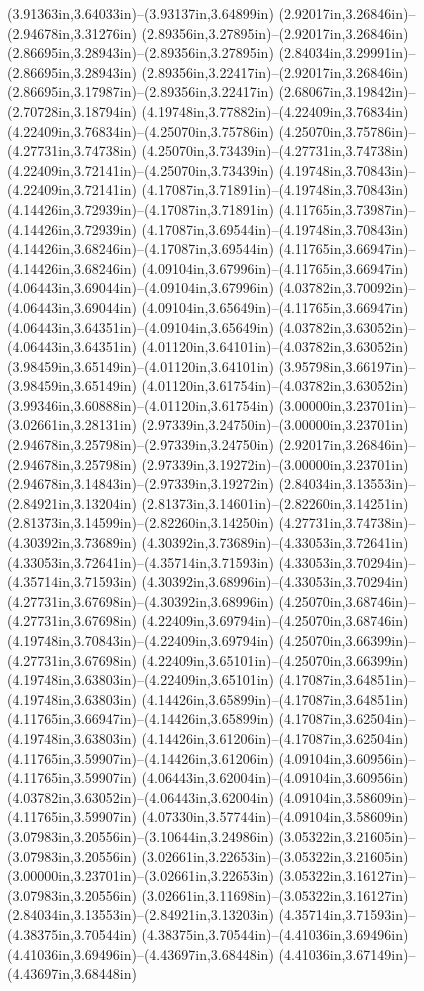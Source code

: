 (3.91363in,3.64033in)--(3.93137in,3.64899in) (2.92017in,3.26846in)--(2.94678in,3.31276in) (2.89356in,3.27895in)--(2.92017in,3.26846in) (2.86695in,3.28943in)--(2.89356in,3.27895in) (2.84034in,3.29991in)--(2.86695in,3.28943in) (2.89356in,3.22417in)--(2.92017in,3.26846in) (2.86695in,3.17987in)--(2.89356in,3.22417in) (2.68067in,3.19842in)--(2.70728in,3.18794in) (4.19748in,3.77882in)--(4.22409in,3.76834in) (4.22409in,3.76834in)--(4.25070in,3.75786in) (4.25070in,3.75786in)--(4.27731in,3.74738in) (4.25070in,3.73439in)--(4.27731in,3.74738in) (4.22409in,3.72141in)--(4.25070in,3.73439in) (4.19748in,3.70843in)--(4.22409in,3.72141in) (4.17087in,3.71891in)--(4.19748in,3.70843in) (4.14426in,3.72939in)--(4.17087in,3.71891in) (4.11765in,3.73987in)--(4.14426in,3.72939in) (4.17087in,3.69544in)--(4.19748in,3.70843in) (4.14426in,3.68246in)--(4.17087in,3.69544in) (4.11765in,3.66947in)--(4.14426in,3.68246in) (4.09104in,3.67996in)--(4.11765in,3.66947in) (4.06443in,3.69044in)--(4.09104in,3.67996in) (4.03782in,3.70092in)--(4.06443in,3.69044in) (4.09104in,3.65649in)--(4.11765in,3.66947in) (4.06443in,3.64351in)--(4.09104in,3.65649in) (4.03782in,3.63052in)--(4.06443in,3.64351in) (4.01120in,3.64101in)--(4.03782in,3.63052in) (3.98459in,3.65149in)--(4.01120in,3.64101in) (3.95798in,3.66197in)--(3.98459in,3.65149in) (4.01120in,3.61754in)--(4.03782in,3.63052in) (3.99346in,3.60888in)--(4.01120in,3.61754in) (3.00000in,3.23701in)--(3.02661in,3.28131in) (2.97339in,3.24750in)--(3.00000in,3.23701in) (2.94678in,3.25798in)--(2.97339in,3.24750in) (2.92017in,3.26846in)--(2.94678in,3.25798in) (2.97339in,3.19272in)--(3.00000in,3.23701in) (2.94678in,3.14843in)--(2.97339in,3.19272in) (2.84034in,3.13553in)--(2.84921in,3.13204in) (2.81373in,3.14601in)--(2.82260in,3.14251in) (2.81373in,3.14599in)--(2.82260in,3.14250in) (4.27731in,3.74738in)--(4.30392in,3.73689in) (4.30392in,3.73689in)--(4.33053in,3.72641in) (4.33053in,3.72641in)--(4.35714in,3.71593in) (4.33053in,3.70294in)--(4.35714in,3.71593in) (4.30392in,3.68996in)--(4.33053in,3.70294in) (4.27731in,3.67698in)--(4.30392in,3.68996in) (4.25070in,3.68746in)--(4.27731in,3.67698in) (4.22409in,3.69794in)--(4.25070in,3.68746in) (4.19748in,3.70843in)--(4.22409in,3.69794in) (4.25070in,3.66399in)--(4.27731in,3.67698in) (4.22409in,3.65101in)--(4.25070in,3.66399in) (4.19748in,3.63803in)--(4.22409in,3.65101in) (4.17087in,3.64851in)--(4.19748in,3.63803in) (4.14426in,3.65899in)--(4.17087in,3.64851in) (4.11765in,3.66947in)--(4.14426in,3.65899in) (4.17087in,3.62504in)--(4.19748in,3.63803in) (4.14426in,3.61206in)--(4.17087in,3.62504in) (4.11765in,3.59907in)--(4.14426in,3.61206in) (4.09104in,3.60956in)--(4.11765in,3.59907in) (4.06443in,3.62004in)--(4.09104in,3.60956in) (4.03782in,3.63052in)--(4.06443in,3.62004in) (4.09104in,3.58609in)--(4.11765in,3.59907in) (4.07330in,3.57744in)--(4.09104in,3.58609in) (3.07983in,3.20556in)--(3.10644in,3.24986in) (3.05322in,3.21605in)--(3.07983in,3.20556in) (3.02661in,3.22653in)--(3.05322in,3.21605in) (3.00000in,3.23701in)--(3.02661in,3.22653in) (3.05322in,3.16127in)--(3.07983in,3.20556in) (3.02661in,3.11698in)--(3.05322in,3.16127in) (2.84034in,3.13553in)--(2.84921in,3.13203in) (4.35714in,3.71593in)--(4.38375in,3.70544in) (4.38375in,3.70544in)--(4.41036in,3.69496in) (4.41036in,3.69496in)--(4.43697in,3.68448in) (4.41036in,3.67149in)--(4.43697in,3.68448in) 